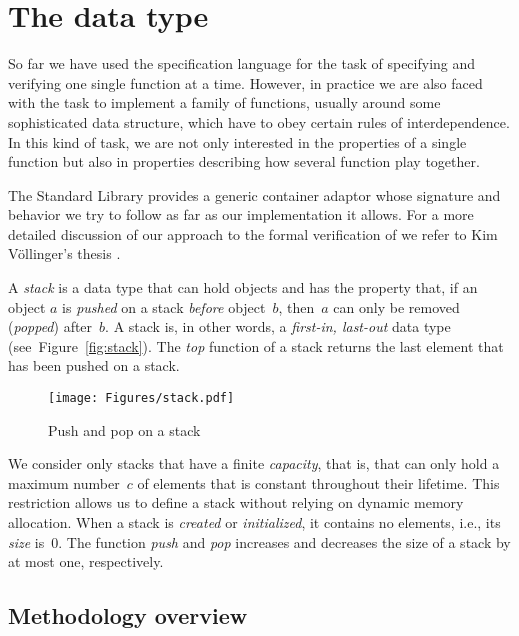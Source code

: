 
\chapter{The \stacktype data type}

So far we have used the \acsl specification language for the task of specifying and verifying
one single \isoc function at a time.
%
However, in practice we are also faced with the task to implement a
family of functions, usually around some sophisticated data structure,
which have to obey certain rules of interdependence.
%
In this kind of task, we are not only interested in the properties of a
single function but also in properties describing how several function play
together.

The \cxx Standard Library provides  a generic container adaptor
 \cite[\S 26.6.6]{cxx-17-draft} whose signature and
behavior we try to follow as far as our \isoc implementation it allows.
For a more detailed discussion of our approach to the formal verification
of \stacktype we refer to Kim Völlinger's thesis \cite{Voellinger_2013_da}.
%

A \emph{stack} is a data type that can hold objects and has the
property that, if an object $a$ is \emph{pushed} on a stack
\emph{before} object~$b$, then~$a$ can only be removed (\emph{popped})
after~$b$.
%
A stack is, in other words, a \emph{first-in, last-out}
data type (see~Figure~\ref{fig:stack}).
%
The \emph{top} function of a stack returns the last element
that has been pushed on a stack.

\begin{figure}[hbt]
\centering
\texttt{[image: Figures/stack.pdf]}
\caption{ Push and pop on a stack}
\end{figure}

We consider only stacks that have a finite \emph{capacity}, that is,
that can only hold a maximum number~$c$ 
of elements that is constant throughout their lifetime.
%
This restriction allows us to define a stack without relying
on dynamic memory
allocation.
%
When a stack is \emph{created} or \emph{initialized}, it contains
no elements, i.e.,
its \emph{size} is~0.
%
The function \emph{push} and \emph{pop} increases and decreases
the size of a stack by at most one, respectively.

\clearpage

\section{Methodology overview}

